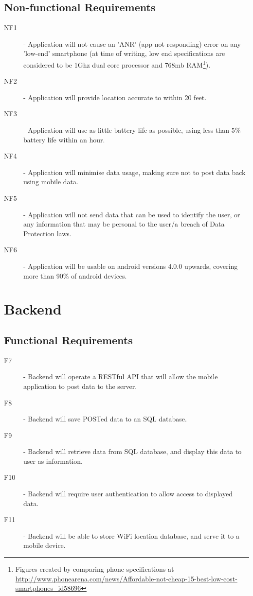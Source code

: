 \documentclass[11pt]{informatics-report}
\begin{document}
\subsection{Non-functional Requirements}
\begin{description}
\item[NF1] - Application will not cause an 'ANR' (app not responding) error on any 'low-end' smartphone (at time of writing, low end specifications are considered to be 1Ghz dual core processor and 768mb RAM\footnote{Figures created by comparing phone specifications at \url{http://www.phonearena.com/news/Affordable-not-cheap-15-best-low-cost-smartphones_id58696}}).
\item[NF2] - Application will provide location accurate to within 20 feet.
\item[NF3] - Application will use as little battery life as possible, using less than 5\% battery life within an hour.
\item[NF4] - Application will minimise data usage, making sure not to post data back using mobile data.
\item[NF5] - Application will not send data that can be used to identify the user, or any information that may be personal to the user/a breach of Data Protection laws.
\item[NF6] - Application will be usable on android versions 4.0.0 upwards, covering more than 90\% of android devices\cite{androidstats}.
\end{description}

\section{Backend}
\subsection{Functional Requirements}
\begin{description}
\item[F7] - Backend will operate a RESTful API that will allow the mobile application to post data to the server.
\item[F8] - Backend will save POSTed data to an SQL database.
\item[F9] - Backend will retrieve data from SQL database, and display this data to user as information.
\item[F10] - Backend will require user authentication to allow access to displayed data.
\item[F11] - Backend will be able to store WiFi location database, and serve it to a mobile device.
\end{description}
\end{document}
